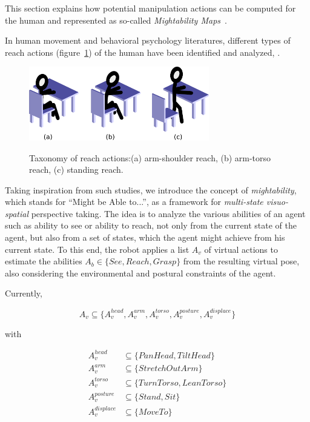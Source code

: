 \documentclass{svmult}
\begin{document}
This section explains how potential manipulation actions can be computed for
the human and represented as so-called \emph{Mightability Maps}~\cite{Pandey2010}.

In human movement and behavioral psychology literatures, different types of
reach actions (figure~\ref{fig|reaches_taxonomy}) of the human have been
identified and analyzed, \cite{Gardner2001, Choi2004}.

\begin{figure}
  \centering
  \includegraphics[width=0.7\textwidth]{./figs/reach_postures.pdf} \\
  \caption {Taxonomy of reach actions:(a) arm-shoulder reach, (b) arm-torso 
  reach, (c) standing reach.}
  \label{fig|reaches_taxonomy}
\end{figure}

Taking inspiration from such studies, we introduce the concept of
\emph{mightability}, which stands for ``Might be Able to...'', as a framework
for \emph{multi-state visuo-spatial} perspective taking. The idea is to analyze
the various abilities of an agent such as ability to see or ability to
reach, not only from the current state of the agent, but also from a set of
states, which the agent might achieve from his current state. To this end,
the robot applies a list $A_v$ of virtual actions to estimate the abilities
$A_b \in \{See, Reach, Grasp\}$ from the resulting virtual pose, also
considering the environmental and postural constraints of the agent.

Currently,

\[ 
A_v \subseteq \{A_v^{head}, A_v^{arm}, A_v^{torso}, A_v^{posture}, A_v^{displace}\}
\]

with

\begin{align*}
A_v^{head} & \subseteq \{PanHead, TiltHead\} \\
A_v^{arm} & \subseteq \{StretchOutArm\} \\
A_v^{torso} & \subseteq \{TurnTorso, LeanTorso\} \\
A_v^{posture} & \subseteq \{Stand, Sit\} \\
A_v^{displace} & \subseteq \{MoveTo\} \\
\end{align*}
\end{document}
